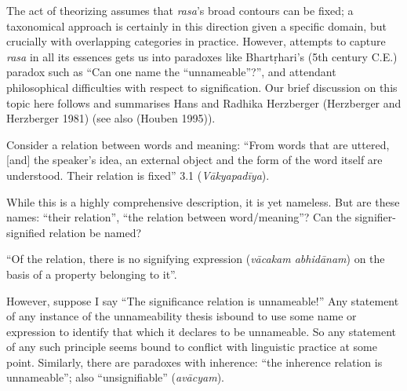 The act of theorizing assumes that \textsl{rasa}’s broad contours can be fixed; a taxonomical approach is certainly in this direction given a specific domain, but crucially with overlapping categories in practice. However, attempts to capture \textsl{rasa} in all its essences gets us into paradoxes like Bhartṛhari's (5th century C.E.) paradox such as “Can one name the “unnameable”?”, and attendant philosophical difficulties with respect to signification. Our brief discussion on this topic here follows and summarises Hans and Radhika Herzberger (Herzberger and Herzberger 1981) (see also (Houben 1995)).

\begin{normalmyquote}
Consider a relation between words and meaning: “From words that are uttered, [and] the speaker's idea, an external object and the form of the word itself are understood. Their relation is fixed” 3.1 (\textsl{Vākyapadīya}). 

\newpage

While this is a highly comprehensive description, it is yet nameless. But are these names: “their relation”, “the relation between word/meaning”? Can the signifier-signified relation be named? 

“Of the relation, there is no signifying expression (\textsl{vācakam abhidānam}) on the basis of a property belonging to it”. 

However, suppose I say “The significance relation is unnameable!” Any statement of any instance of the unnameability thesis is\break bound to use some name or expression to identify that which it declares to be unnameable. So any statement of any such principle seems bound to conflict with linguistic practice at some point. Similarly, there are paradoxes with inherence: “the inherence relation is unnameable”; also “unsignifiable” (\textsl{avācyam}).
\end{normalmyquote}


